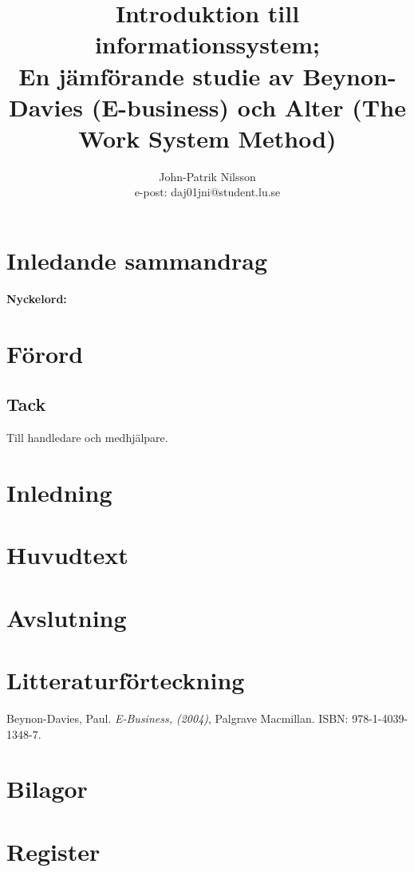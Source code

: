 \documentclass[a4paper,12pt]{article}
\title{\textsf{\textbf{Introduktion till informationssystem; \\ 
    En jämförande studie av Beynon-Davies (E-business) och
    Alter (The Work System Method)}}}
\author{John-Patrik Nilsson \\
	e-post: daj01jni@student.lu.se}
\begin{document}



\maketitle

\section*{\textsf{Inledande sammandrag}}

\textbf{Nyckelord:} 

\tableofcontents

\section{\textsf{Förord}}

\subsection{\textsf{Tack}}
Till handledare och medhjälpare.




\section{\textsf{Inledning}}

\section{\textsf{Huvudtext}}

\section{\textsf{Avslutning}}



\section*{\textsf{Litteraturförteckning}}
Beynon-Davies, Paul. \textit{E-Business, (2004)}, Palgrave Macmillan. ISBN: 978-1-4039-1348-7.

\appendix
\section{\textsf{Bilagor}}

\section{\textsf{Register}}
\end{document}
